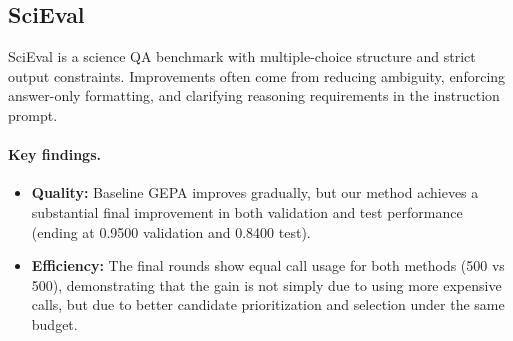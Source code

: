 \begin{table}[H]
\centering
\small
\caption{Comparison between Original GEPA and Ours (\textit{MATH-500}).}
\label{tab:math500}
\end{table}

\subsection{SciEval}
SciEval is a science QA benchmark with multiple-choice structure and strict output constraints. Improvements often come from reducing ambiguity, enforcing answer-only formatting, and clarifying reasoning requirements in the instruction prompt.

\paragraph{Key findings.}
\begin{itemize}
    \item \textbf{Quality:} Baseline GEPA improves gradually, but our method achieves a substantial final improvement in both validation and test performance (ending at 0.9500 validation and 0.8400 test).
    \item \textbf{Efficiency:} The final rounds show equal call usage for both methods (500 vs 500), demonstrating that the gain is not simply due to using more expensive calls, but due to better candidate prioritization and selection under the same budget.
\end{itemize}

